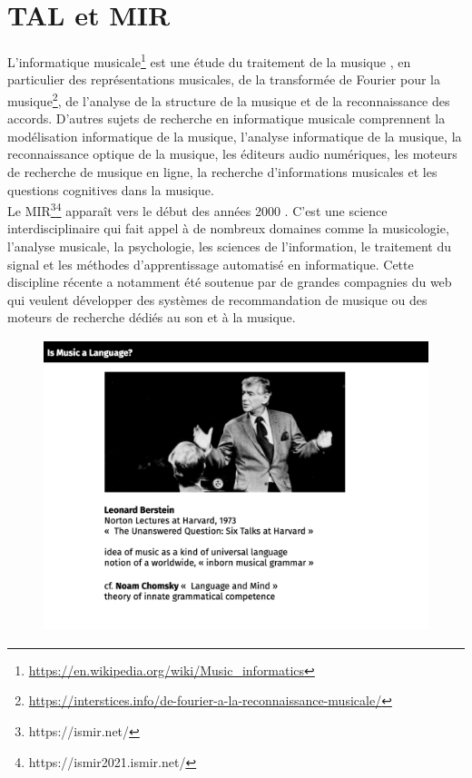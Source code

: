\section{TAL et MIR}
L'informatique musicale\footnote{\url{https://en.wikipedia.org/wiki/Music_informatics}} 
est une étude du traitement de la musique \cite{book_muller}, en particulier des représentations musicales, de la transformée de Fourier pour la musique\footnote{\url{https://interstices.info/de-fourier-a-la-reconnaissance-musicale/}}, de l'analyse de la structure de la musique et de la reconnaissance des accords. 
D'autres sujets de recherche en informatique musicale comprennent la modélisation informatique de la musique, l'analyse informatique de la musique, la reconnaissance optique de la musique, les éditeurs audio numériques, les moteurs de recherche de musique en ligne, la recherche d'informations musicales et les questions cognitives
 dans la musique.\\
Le MIR\footnote{https://ismir.net/}\footnote{https://ismir2021.ismir.net/} apparaît vers le début des années 2000 \cite{MIR_1}. 
C’est une science interdisciplinaire qui fait appel à de nombreux domaines comme la musicologie, l’analyse musicale, la psychologie, les sciences de l’information, le traitement du signal et les méthodes d’apprentissage automatisé en informatique. 
Cette discipline récente a notamment été soutenue par de grandes compagnies du web qui veulent développer des systèmes de recommandation de musique ou des moteurs de recherche dédiés au son et à la musique.

\begin{figure}[!h]
	\centering
	\includegraphics[height=85mm, width=120mm]{z_images/1_contexte/0_Bernstein.png}
\end{figure}

